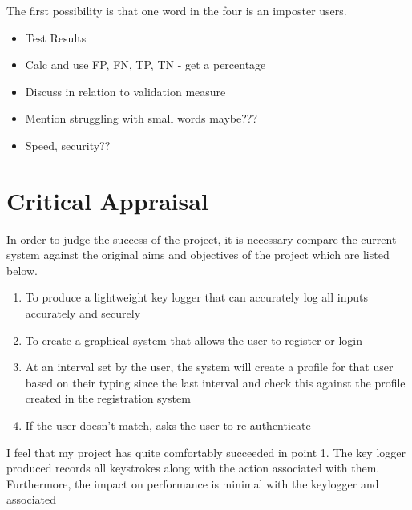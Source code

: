 \documentclass[10pt,a4paper]{report}
\begin{document}
The first possibility is that one word in the four is an imposter users.	




\begin{itemize}
	\item Test Results
	\item Calc and use FP, FN, TP, TN - get a percentage
	\item Discuss in relation to validation measure
	\item Mention struggling with small words maybe???
	\item Speed, security??
\end{itemize}
\chapter{Critical Appraisal}

In order to judge the success of the project, it is necessary compare the current system against the original aims and objectives of the project which are listed below. 
\begin{enumerate}
	\item To produce a lightweight key logger that can accurately log all inputs accurately and securely
	\item To create a graphical system that allows the user to register or login
	\item At an interval set by the user, the system will create a profile for that user based on their typing since the last interval and check this against the profile created in the registration system
	\item If the user doesn't match, asks the user to re-authenticate
\end{enumerate}

I feel that my project has quite comfortably succeeded in point 1. The key logger produced records all keystrokes along with the action associated with them. Furthermore, the impact on performance is minimal with the keylogger and associated 
\end{document}
